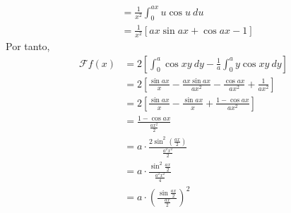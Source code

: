 \documentclass[12pt]{report}
\newcounter{it}
\theoremstyle{largebreak}
\newcommand{\fou}[1]{\ensuremath{\mathcal{F}#1}}
\begin{document}
\begin{sol}
\begin{equation*}
\begin{split}
                &=\frac{1}{x^2}\int_0^{ax}u\cos u\:du\\
                &=\frac{1}{x^2}\left[ax\sin ax+\cos ax-1\right]
            \end{split}
        \end{equation*}
        Por tanto,
        \begin{equation*}
            \begin{split}
                \fou{f}(x)&=2\left[\int_{0}^a\cos xy\:dy-\frac{1}{a}\int_0^a y\cos xy\:dy\right]\\
                &=2\left[\frac{\sin ax}{x}-\frac{ax\sin ax}{ax^2}-\frac{\cos ax}{ax^2}+\frac{1}{ax^2}\right]\\
                &=2\left[\frac{\sin ax}{x}-\frac{\sin ax}{x}+\frac{1-\cos ax}{ax^2}\right]\\
                &=\frac{1-\cos ax}{\frac{ax^2}{2}}\\
                &=a\cdot\frac{2\sin^2\left(\frac{ax}{2}\right)}{\frac{a^2x^2}{2}}\\
                &=a\cdot\frac{\sin^2\frac{ax}{2}}{\frac{a^2x^2}{4}}\\
                &=a\cdot\left(\frac{\sin\frac{ax}{2}}{\frac{ax}{2}}\right)^2\\
            \end{split}
        \end{equation*}
        

\end{sol}
\end{document}
